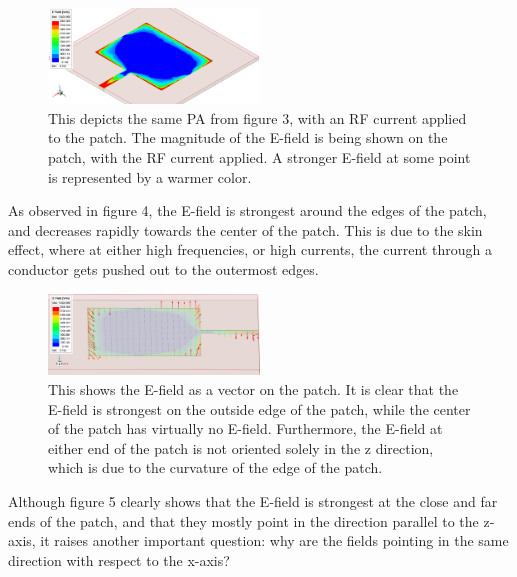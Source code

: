 \documentclass[12pt]{article}
\begin{document}
\begin{figure}[h]
    \centering
    \includegraphics[width=0.5\textwidth]{basic-patch-antenna-MagE-on-patch.png}
    \caption{This depicts the same PA from figure 3, with an RF current applied to the patch. The magnitude of the E-field is being shown on the patch, with the RF current applied. A stronger E-field at some point is represented by a warmer color.}
\end{figure}

As observed in figure 4, the E-field is strongest around the edges of the patch, and decreases rapidly towards the center of the patch. This is due to the skin effect, where at either high frequencies, or high currents, the current through a conductor gets pushed out to the outermost edges. 

\begin{figure}[h]
    \centering
    \includegraphics[width=0.5\textwidth]{basic-patch-antenna-VecE-onPatch-t0.png}
    \caption{This shows the E-field as a vector on the patch. It is clear that the E-field is strongest on the outside edge of the patch, while the center of the patch has virtually no E-field. Furthermore, the E-field at either end of the patch is not oriented solely in the z direction, which is due to the curvature of the edge of the patch.}
\end{figure}

Although figure 5 clearly shows that the E-field is strongest at the close and far ends of the patch, and that they mostly point in the direction parallel to the z-axis, it raises another important question: why are the fields pointing in the same direction with respect to the x-axis?  
\end{document}
